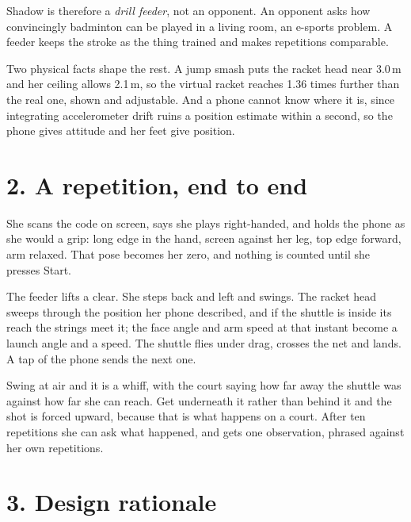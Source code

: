 \documentclass[11pt,a4paper]{article}
\begin{document}
Shadow is therefore a \emph{drill feeder}, not an opponent. An opponent asks how
convincingly badminton can be played in a living room, an e-sports problem. A feeder
keeps the stroke as the thing trained and makes repetitions comparable.

Two physical facts shape the rest. A jump smash puts the racket head near 3.0\,m and
her ceiling allows 2.1\,m, so the virtual racket reaches 1.36 times further than the
real one, shown and adjustable. And a phone cannot know where it is, since integrating
accelerometer drift ruins a position estimate within a second, so the phone gives
attitude and her feet give position.

\section*{2. A repetition, end to end}

She scans the code on screen, says she plays right-handed, and holds the phone as
she would a grip: long edge in the hand, screen against her leg, top edge forward, arm
relaxed. That pose becomes her zero, and nothing is counted until she presses Start.

The feeder lifts a clear. She steps back and left and swings. The racket head sweeps
through the position her phone described, and if the shuttle is inside its reach the
strings meet it; the face angle and arm speed at that instant become a launch angle and
a speed. The shuttle flies under drag, crosses the net and lands. A tap of the phone
sends the next one.

Swing at air and it is a whiff, with the court saying how far away the shuttle was
against how far she can reach. Get underneath it rather than behind it and the shot is
forced upward, because that is what happens on a court. After ten repetitions she can
ask what happened, and gets one observation, phrased against her own repetitions.

\section*{3. Design rationale}
\end{document}
